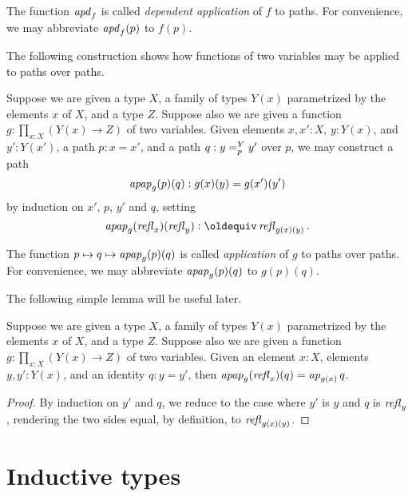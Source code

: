 The function $\mathop{{\it apd}_{f}}$ is called {\em dependent application} of $f$ to paths.  For convenience, we may abbreviate $\mathop{{\it apd}_{f}} (p)$ to $f(p)$.

The following construction shows how functions of two variables may be applied to paths over paths.

\begin{definition}\label{def:applfun2}
  Suppose we are given a type $X$, a family of types $Y(x)$ parametrized by the elements $x$ of $X$, and a type $Z$.
  Suppose also we are given a function $g : \prod_{x:X} (Y(x) \to Z)$ of two variables.
  Given elements $x,x':X$, $y:Y(x)$, and
  $y':Y(x')$, a path $p : x = x'$, and a path $q :y =^{Y}_{p} y'$ over $p$,
  we may construct a path $$\mathop{{\it apap}_{g}(p)(q)} : g(x)(y) = g(x')(y')$$ by induction on $x'$, $p$, $y'$ and $q$,
  setting $$\apap g {\refl x}{\refl y} \defeq \refl {g(x)(y)}.$$
\end{definition}

The function $p \mapsto q \mapsto \mathop{{\it apap}_{g}(p)(q)}$ is called {\em application} of $g$ to paths over paths.
For convenience, we may abbreviate $\mathop{{\it apap}_{g}(p)(q)}$ to $g(p)(q)$.

The following simple lemma will be useful later.

\begin{lemma}\label{def:applfun2comp}
  Suppose we are given a type $X$, a family of types $Y(x)$ parametrized by the elements $x$ of $X$, and a type $Z$.
  Suppose also we are given a function $g : \prod_{x:X} (Y(x) \to Z)$ of two variables.
  Given an element $x:X$, elements $y, y':Y(x)$, and an identity $q : y = y'$, then
  $\mathop{{\it apap}_{g}(\mathop{{\it refl}_{x}})(q)} = \mathop{{\it ap}_{g(x)}} q$.
\end{lemma}

\begin{proof}
  By induction on $y'$ and $q$, we reduce to the case where $y'$ is $y$ and $q$ is $\mathop{{\it refl}_{y}}$, rendering the two sides equal, by definition, to $\mathop{{\it refl}_{g(x)(y)}}$.
\end{proof}


\section{Inductive types}
\label{sec:inductive-types}

